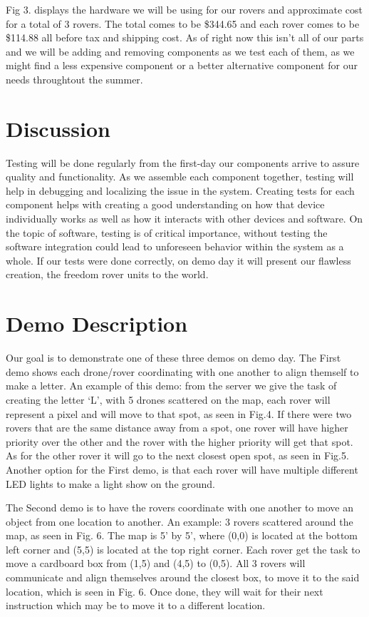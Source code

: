 \documentclass[conference]{IEEEtran}
\begin{document}
Fig 3. displays the hardware we will be using for our rovers and approximate cost for a total of 3 rovers. The total comes to be \$344.65 and each rover comes to be \$114.88 all before tax and shipping cost. As of right now this isn't all of our parts and we will be adding and removing components as we test each of them, as we might find a less expensive component or a better alternative component for our needs throughtout the summer.

\section{Discussion}
Testing will be done regularly from the first-day our components arrive to assure quality and functionality. As we assemble each component together, testing will help in debugging and localizing the issue in the system. Creating tests for each component helps with creating a good understanding on how that device individually works as well as how it interacts with other devices and software. On the topic of software, testing is of critical importance, without testing the software integration could lead to unforeseen behavior within the system as a whole. If our tests were done correctly, on demo day it will present our flawless creation, the freedom rover units to the world.
\section{Demo Description} 
Our goal is to demonstrate one of these three demos on demo day. The First demo shows each drone/rover coordinating with one another to align themself to make a letter. An example of this demo: from the server we give the task of creating the letter ‘L’, with 5 drones scattered on the map, each rover will represent a pixel and will move to that spot, as seen in Fig.4. If there were two rovers that are the same distance away from a spot, one rover will have higher priority over the other and the rover with the higher priority will get that spot. As for the other rover it will go to the next closest open spot, as seen in Fig.5. Another option for the First demo, is that each rover will have multiple different LED lights to make a light show on the ground.

The Second demo is to have the rovers coordinate with one another to move an object from one location to another. An example: 3 rovers scattered around the map, as seen in Fig. 6. The map is 5’ by 5’, where (0,0) is located at the bottom left corner and (5,5) is located at the top right corner. Each rover get the task to move a cardboard box from (1,5) and (4,5) to (0,5). All 3 rovers will communicate and align themselves around the closest box, to move it to the said location, which is seen in Fig. 6. Once done, they will wait for their next instruction which may be to move it to a different location. 
\end{document}
